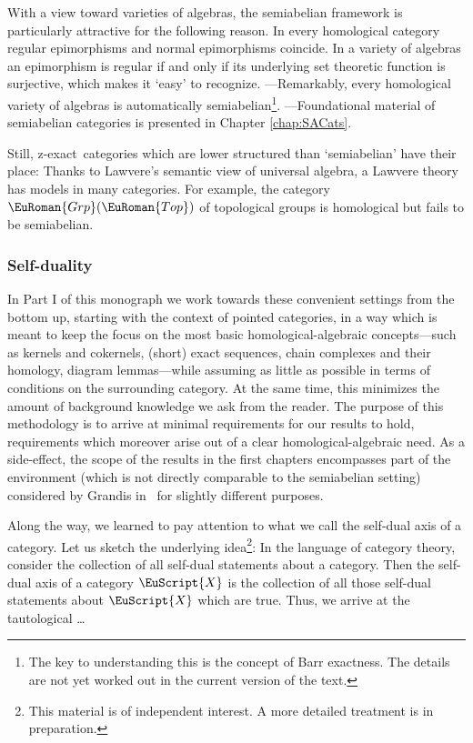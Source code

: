 \documentclass [12pt,oneside]{book}%
\theoremstyle{captionstyle}  %
\newcommand{\TopGrps}{\EuRoman{Grp}(\EuRoman{Top})}							%
\newcommand{\Ctgry}[1]{\EuScript{#1}}					%
\newcommand{\ZExact}{z-exact}									%
\begin{document}
With a view toward varieties of algebras, the semiabelian framework is particularly attractive for the following reason. In every homological category regular epimorphisms and normal epimorphisms coincide. In a variety of algebras  an epimorphism is regular if and only if its underlying set theoretic function is surjective, which makes it `easy' to recognize. ---Remarkably, every homological variety of algebras is automatically semiabelian\footnote{The key to understanding this is the concept of Barr exactness. The details are not yet worked out in the current version of the text.}. ---Foundational material of semiabelian categories is presented in Chapter \ref{chap:SACats}.

Still, \ZExact\ categories which are lower structured than `semiabelian' have their place: Thanks to Lawvere's semantic view of universal algebra, a Lawvere theory has models in many categories. For example, the category $\TopGrps$ of topological groups is homological but fails to be semiabelian.

\subsubsection*{Self-duality}
In Part I of this monograph we work towards these convenient settings from the bottom up, starting with the context of pointed categories, in a way which is meant to keep the focus on the most basic homological-algebraic concepts---such as kernels and cokernels, (short) exact sequences, chain complexes and their homology, diagram lemmas---while assuming as little as possible in terms of conditions on the surrounding category. At the same time, this minimizes the amount of background knowledge we ask from the reader. The purpose of this methodology is to arrive at minimal requirements for our results to hold, requirements which moreover arise out of a clear homological-algebraic need. As a side-effect, the scope of the results in the first chapters encompasses part of the environment (which is not directly comparable to the semiabelian setting) considered by Grandis in~\cite{Grandis-HA2} for slightly different purposes.

Along the way, we learned to pay attention to what we call the self-dual axis of a category. Let us sketch the underlying idea\footnote{This material is of independent interest. A more detailed treatment is in preparation.}: In the language of category theory, consider the collection of all self-dual statements about a category. Then the self-dual axis of a category $\Ctgry{X}$ is the collection of all those self-dual statements about $\Ctgry{X}$ which are true. Thus, we arrive at the tautological \dots
\end{document}
